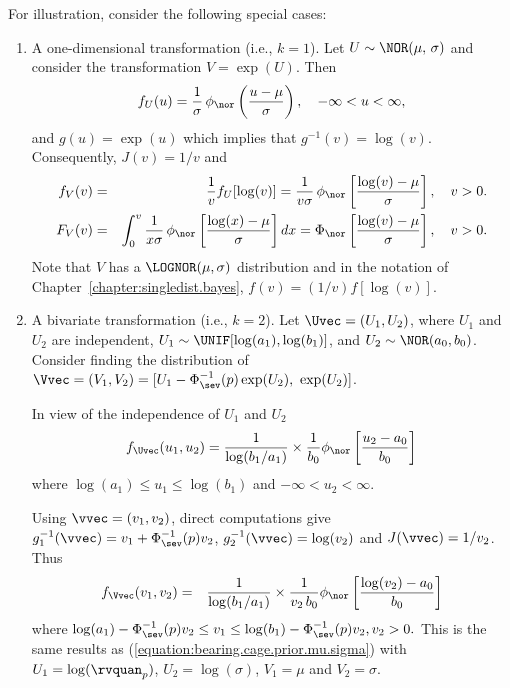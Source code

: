 For illustration, consider the following special cases:
\begin{enumerate}
\item
A one-dimensional transformation (i.e.,
$k=1$).
Let $U\sim \NOR(\mu,\, \sigma)$ and
consider the transformation $V=\exp(U)$.
Then
\begin{displaymath}
f_{U}(u)=\frac{1}{\sigma} \, 
  \phi_{\nor} \left (
	 \frac{u-\mu}
	      {\sigma}
              \right ), \quad -\infty< u < \infty,
\end{displaymath}
and $g(u)=\exp(u)$ which 
implies that $g^{-1}(v)=\log(v)$. Consequently,
$J(v)=1/v$  and
\begin{eqnarray*}
f_{V}(v)&=&\frac{1}{v} f_{U}[\log(v)]
=\frac{1}{v \sigma} \, 
  \phi_{\nor} \left [
	 \frac{\log(v)-\mu}
	      {\sigma}
              \right ], \quad v>0.
\\
F_{V}(v)&=&\int_{0}^{v}\frac{1}{x  \sigma} \, 
  \phi_{\nor} \left [
	 \frac{\log(x)-\mu}
	      {\sigma}
              \right ] dx
=\Phi_{\nor}
    \left [
   \frac{
    \log(v)-\mu
	}
	{
\sigma
        }
    \right ], \quad v>0.
\end{eqnarray*}
Note that $V$ has a $\LOGNOR(\mu,\sigma)$ 
distribution and
in the notation of 
Chapter~\ref{chapter:singledist.bayes}, 
$f(v)=(1/v)
f[\log(v)]$.
\item
A bivariate transformation
(i.e., $k=2$).
Let $\Uvec=(U_{1}, U_{2})$,
where $U_{1}$ and $U_{2}$ are independent,
$U_{1} \sim \UNIF[ \log(a_{1}), \log(b_{1})]$,
and 
$U_{2} \sim \NOR(a_{0}, b_{0})$.
Consider finding the distribution of
$\Vvec=(V_{1}, V_{2})=
[U_{1}- \Phi^{-1}_{\sev}(p) \exp (U_{2}), \,\,
\exp(U_{2})]$.

In view of the independence of
$U_{1}$ and $U_{2}$
\begin{displaymath}
f_{\Uvec}(u_{1}, u_{2})= \frac{ 1 	 } 	 
         { \log(b_{1}/a_{1}) 	 } 	\times 
\frac{1}
     {b_{0} }
\phi_{\nor} \left [
       \frac{
       u_{2}-a_{0}	        
            }
            {
                    b_{0}            
            }
            \right ]
\end{displaymath}
where
$\log(a_{1}) \le u_{1} \le \log(b_{1})$
and $-\infty < u_{2} < \infty$.

Using $\vvec=(v_{1}, v_{2})$, 
direct computations give 
$g_{1}^{-1}(\vvec)=
v_{1}+\Phi^{-1}_{\sev}(p)v_{2}$, $g_{2}^{-1}(\vvec)=\log(v_{2})$ and
$J(\vvec)=1/v_{2}$. Thus
\begin{eqnarray*}
f_{\Vvec}(v_{1}, v_{2})&=&
\frac{ 1 	 } 	 
         {\log(b_{1}/a_{1}) 	 } 	\times 
\frac{
     1
     }
     {
v_{2} \, b_{0}
     }
\phi_{\nor} 		 
\left [
\frac{
\log(v_{2})-a_{0}	 
     } 
     { 
b_{0}
     }
\right ]
\end{eqnarray*}
where
$
\log(a_{1})-\Phi^{-1}_{\sev}(p) v_{2} \le   v_{1}   \le \log(b_{1})-\Phi^{-1}_{\sev}(p) v_{2},
v_{2} > 0.$ This is the same 
results as 
(\ref{equation:bearing.cage.prior.mu.sigma})
with $U_{1}=\log(\rvquan_{p})$, $U_{2}=\log(\sigma)$,
$V_{1}=\mu$ and $V_{2}=\sigma$.
\end{enumerate}

